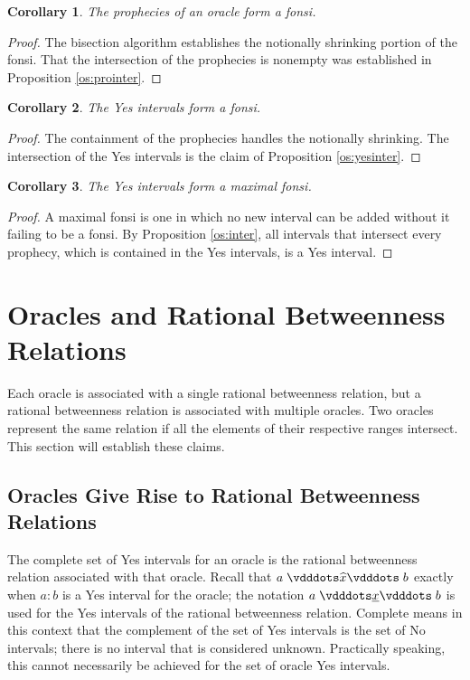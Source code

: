 \documentclass[12pt]{article}
\newtheorem{corollary}{Corollary}[section]
\begin{document}
\begin{corollary}
    The prophecies of an oracle form a fonsi.
\end{corollary}

\begin{proof}
    The bisection algorithm establishes the notionally shrinking portion of the fonsi. That the intersection of the prophecies is nonempty was established in Proposition \ref{os:prointer}.
\end{proof}


\begin{corollary}
    The Yes intervals form a fonsi. 
\end{corollary}

\begin{proof}
    The containment of the prophecies handles the notionally shrinking. The intersection of the Yes intervals is the claim of Proposition \ref{os:yesinter}.
\end{proof}


\begin{corollary}
    The Yes intervals form a maximal fonsi.
\end{corollary}

\begin{proof}
A maximal fonsi is one in which no new interval can be added without it failing to be a fonsi. By Proposition \ref{os:inter}, all intervals that intersect every prophecy, which is contained in the Yes intervals, is a Yes interval. 
\end{proof}




\section{Oracles and Rational Betweenness Relations}

Each oracle is associated with a single rational betweenness relation, but a rational betweenness relation is associated with multiple oracles. Two oracles represent the same relation if all the elements of their respective ranges intersect. This section will establish these claims. 

\subsection{Oracles Give Rise to Rational Betweenness Relations}

The complete set of Yes intervals for an oracle is the rational betweenness relation associated with that oracle. Recall that $a \xora b$ exactly when $a:b$ is a Yes interval for the oracle; the notation $a \xrel b$ is used for the Yes intervals of the rational betweenness relation. Complete means in this context that the complement of the set of Yes intervals is the set of No intervals; there is no interval that is considered unknown. Practically speaking, this cannot necessarily be achieved for the set of oracle Yes intervals.
\end{document}
